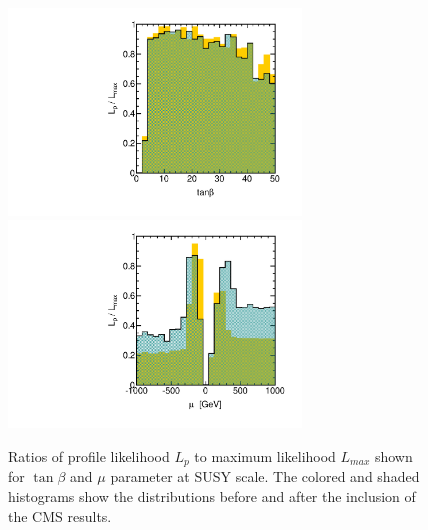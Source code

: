 \begin{figure}[htbp]
\begin{center}
\includegraphics[height=5.5cm]{figs/fig_tanbeta.pdf} 
\includegraphics[height=5.5cm]{figs/fig_mu.pdf} 
\caption{Ratios of profile likelihood $L_p$ to maximum likelihood $L_{max}$ shown for $\tan\beta$ and $\mu$ parameter at SUSY scale.  The colored and shaded histograms show the distributions before and after the inclusion of the CMS results.}
\label{fig:LRwcms_tbmu}
\end{center}
\end{figure}



